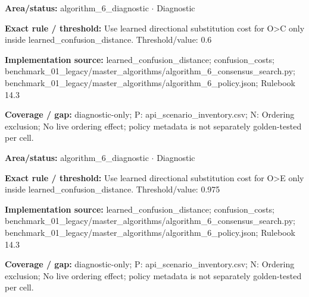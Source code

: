 \begin{tcolorbox}[enhanced,breakable,colback=white,colframe=Muted!45,boxrule=0.45pt,arc=1.5pt,left=6pt,right=6pt,top=5pt,bottom=5pt,title={\texttt{A6-LEARNED-SUBSTITUTION-O-C}},title after break={\texttt{A6-LEARNED-SUBSTITUTION-O-C}\ (continued)},fonttitle=\headingfont\bfseries\color{Navy},coltitle=Navy]
\textbf{Area/status:} algorithm\_\allowbreak{}6\_\allowbreak{}diagnostic $\boldsymbol{\cdot}$ Diagnostic\par
\smallskip
\textbf{Exact rule / threshold:} Use learned directional substitution cost for O>C only inside learned\_\allowbreak{}confusion\_\allowbreak{}distance. Threshold/\allowbreak{}value: 0.6\par
\smallskip
\textbf{Implementation source:} learned\_\allowbreak{}confusion\_\allowbreak{}distance; confusion\_\allowbreak{}costs; benchmark\_\allowbreak{}01\_\allowbreak{}legacy/\allowbreak{}master\_\allowbreak{}algorithms/\allowbreak{}algorithm\_\allowbreak{}6\_\allowbreak{}consensus\_\allowbreak{}search.py; benchmark\_\allowbreak{}01\_\allowbreak{}legacy/\allowbreak{}master\_\allowbreak{}algorithms/\allowbreak{}algorithm\_\allowbreak{}6\_\allowbreak{}policy.json; Rulebook 14.3\par
\smallskip
\textbf{Coverage / gap:} diagnostic-only; P: api\_\allowbreak{}scenario\_\allowbreak{}inventory.csv; N: Ordering exclusion; No live ordering effect; policy metadata is not separately golden-tested per cell.
\end{tcolorbox}
\begin{tcolorbox}[enhanced,breakable,colback=white,colframe=Muted!45,boxrule=0.45pt,arc=1.5pt,left=6pt,right=6pt,top=5pt,bottom=5pt,title={\texttt{A6-LEARNED-SUBSTITUTION-O-E}},title after break={\texttt{A6-LEARNED-SUBSTITUTION-O-E}\ (continued)},fonttitle=\headingfont\bfseries\color{Navy},coltitle=Navy]
\textbf{Area/status:} algorithm\_\allowbreak{}6\_\allowbreak{}diagnostic $\boldsymbol{\cdot}$ Diagnostic\par
\smallskip
\textbf{Exact rule / threshold:} Use learned directional substitution cost for O>E only inside learned\_\allowbreak{}confusion\_\allowbreak{}distance. Threshold/\allowbreak{}value: 0.975\par
\smallskip
\textbf{Implementation source:} learned\_\allowbreak{}confusion\_\allowbreak{}distance; confusion\_\allowbreak{}costs; benchmark\_\allowbreak{}01\_\allowbreak{}legacy/\allowbreak{}master\_\allowbreak{}algorithms/\allowbreak{}algorithm\_\allowbreak{}6\_\allowbreak{}consensus\_\allowbreak{}search.py; benchmark\_\allowbreak{}01\_\allowbreak{}legacy/\allowbreak{}master\_\allowbreak{}algorithms/\allowbreak{}algorithm\_\allowbreak{}6\_\allowbreak{}policy.json; Rulebook 14.3\par
\smallskip
\textbf{Coverage / gap:} diagnostic-only; P: api\_\allowbreak{}scenario\_\allowbreak{}inventory.csv; N: Ordering exclusion; No live ordering effect; policy metadata is not separately golden-tested per cell.
\end{tcolorbox}
